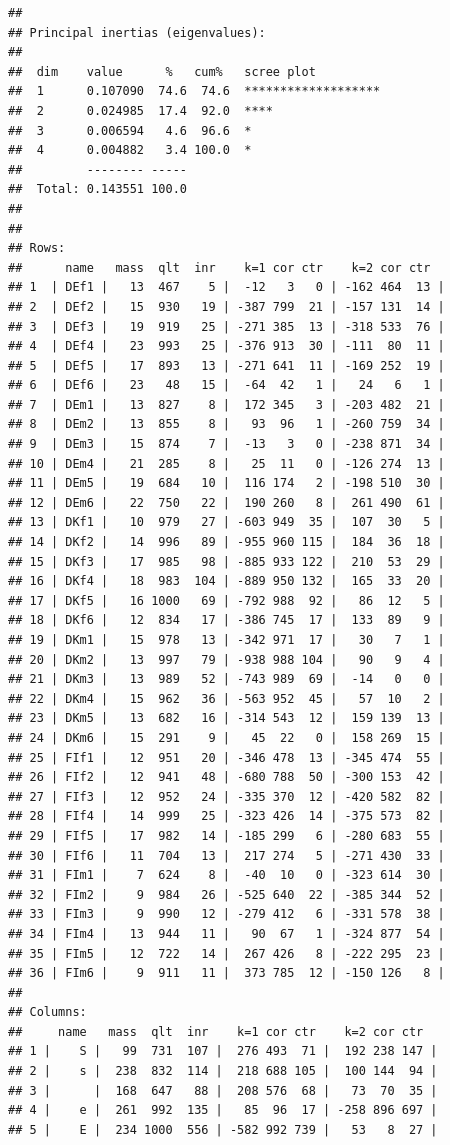 \documentclass[
  finnish,
]{book}
\begin{document}
\begin{verbatim}
## 
## Principal inertias (eigenvalues):
## 
##  dim    value      %   cum%   scree plot               
##  1      0.107090  74.6  74.6  *******************      
##  2      0.024985  17.4  92.0  ****                     
##  3      0.006594   4.6  96.6  *                        
##  4      0.004882   3.4 100.0  *                        
##         -------- -----                                 
##  Total: 0.143551 100.0                                 
## 
## 
## Rows:
##      name   mass  qlt  inr    k=1 cor ctr    k=2 cor ctr  
## 1  | DEf1 |   13  467    5 |  -12   3   0 | -162 464  13 |
## 2  | DEf2 |   15  930   19 | -387 799  21 | -157 131  14 |
## 3  | DEf3 |   19  919   25 | -271 385  13 | -318 533  76 |
## 4  | DEf4 |   23  993   25 | -376 913  30 | -111  80  11 |
## 5  | DEf5 |   17  893   13 | -271 641  11 | -169 252  19 |
## 6  | DEf6 |   23   48   15 |  -64  42   1 |   24   6   1 |
## 7  | DEm1 |   13  827    8 |  172 345   3 | -203 482  21 |
## 8  | DEm2 |   13  855    8 |   93  96   1 | -260 759  34 |
## 9  | DEm3 |   15  874    7 |  -13   3   0 | -238 871  34 |
## 10 | DEm4 |   21  285    8 |   25  11   0 | -126 274  13 |
## 11 | DEm5 |   19  684   10 |  116 174   2 | -198 510  30 |
## 12 | DEm6 |   22  750   22 |  190 260   8 |  261 490  61 |
## 13 | DKf1 |   10  979   27 | -603 949  35 |  107  30   5 |
## 14 | DKf2 |   14  996   89 | -955 960 115 |  184  36  18 |
## 15 | DKf3 |   17  985   98 | -885 933 122 |  210  53  29 |
## 16 | DKf4 |   18  983  104 | -889 950 132 |  165  33  20 |
## 17 | DKf5 |   16 1000   69 | -792 988  92 |   86  12   5 |
## 18 | DKf6 |   12  834   17 | -386 745  17 |  133  89   9 |
## 19 | DKm1 |   15  978   13 | -342 971  17 |   30   7   1 |
## 20 | DKm2 |   13  997   79 | -938 988 104 |   90   9   4 |
## 21 | DKm3 |   13  989   52 | -743 989  69 |  -14   0   0 |
## 22 | DKm4 |   15  962   36 | -563 952  45 |   57  10   2 |
## 23 | DKm5 |   13  682   16 | -314 543  12 |  159 139  13 |
## 24 | DKm6 |   15  291    9 |   45  22   0 |  158 269  15 |
## 25 | FIf1 |   12  951   20 | -346 478  13 | -345 474  55 |
## 26 | FIf2 |   12  941   48 | -680 788  50 | -300 153  42 |
## 27 | FIf3 |   12  952   24 | -335 370  12 | -420 582  82 |
## 28 | FIf4 |   14  999   25 | -323 426  14 | -375 573  82 |
## 29 | FIf5 |   17  982   14 | -185 299   6 | -280 683  55 |
## 30 | FIf6 |   11  704   13 |  217 274   5 | -271 430  33 |
## 31 | FIm1 |    7  624    8 |  -40  10   0 | -323 614  30 |
## 32 | FIm2 |    9  984   26 | -525 640  22 | -385 344  52 |
## 33 | FIm3 |    9  990   12 | -279 412   6 | -331 578  38 |
## 34 | FIm4 |   13  944   11 |   90  67   1 | -324 877  54 |
## 35 | FIm5 |   12  722   14 |  267 426   8 | -222 295  23 |
## 36 | FIm6 |    9  911   11 |  373 785  12 | -150 126   8 |
## 
## Columns:
##     name   mass  qlt  inr    k=1 cor ctr    k=2 cor ctr  
## 1 |    S |   99  731  107 |  276 493  71 |  192 238 147 |
## 2 |    s |  238  832  114 |  218 688 105 |  100 144  94 |
## 3 |      |  168  647   88 |  208 576  68 |   73  70  35 |
## 4 |    e |  261  992  135 |   85  96  17 | -258 896 697 |
## 5 |    E |  234 1000  556 | -582 992 739 |   53   8  27 |
\end{verbatim}
\end{document}
